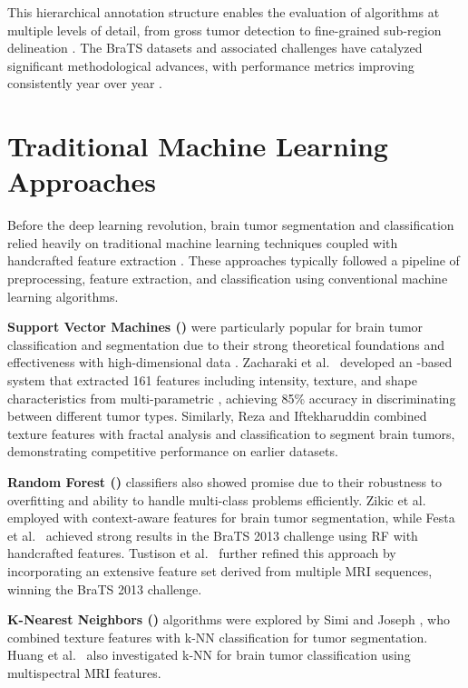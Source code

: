 This hierarchical annotation structure enables the evaluation of algorithms at multiple levels of detail, from gross tumor detection to fine-grained sub-region delineation \cite{Bakas2018}. The BraTS datasets and associated challenges have catalyzed significant methodological advances, with performance metrics improving consistently year over year \cite{Isensee2021}.

\section{Traditional Machine Learning Approaches}

Before the deep learning revolution, brain tumor segmentation and classification relied heavily on traditional machine learning techniques coupled with handcrafted feature extraction \cite{Gordillo2013}. These approaches typically followed a pipeline of preprocessing, feature extraction, and classification using conventional machine learning algorithms.

\textbf{Support Vector Machines ()} were particularly popular for brain tumor classification and segmentation due to their strong theoretical foundations and effectiveness with high-dimensional data \cite{Bauer2011}. Zacharaki et al.\ \cite{Zacharaki2009} developed an -based system that extracted 161 features including intensity, texture, and shape characteristics from multi-parametric , achieving 85\% accuracy in discriminating between different tumor types. Similarly, Reza and Iftekharuddin \cite{Reza2013} combined texture features with fractal analysis and  classification to segment brain tumors, demonstrating competitive performance on earlier  datasets.

\textbf{Random Forest ()} classifiers also showed promise due to their robustness to overfitting and ability to handle multi-class problems efficiently. Zikic et al.\ \cite{Zikic2012} employed  with context-aware features for brain tumor segmentation, while Festa et al.\ \cite{Festa2013} achieved strong results in the BraTS 2013 challenge using RF with handcrafted features. Tustison et al.\ \cite{Tustison2015} further refined this approach by incorporating an extensive feature set derived from multiple MRI sequences, winning the BraTS 2013 challenge.

\textbf{K-Nearest Neighbors ()} algorithms were explored by Simi and Joseph \cite{Simi2014}, who combined texture features with k-NN classification for tumor segmentation. Huang et al.\ \cite{Huang2014} also investigated k-NN for brain tumor classification using multispectral MRI features.

